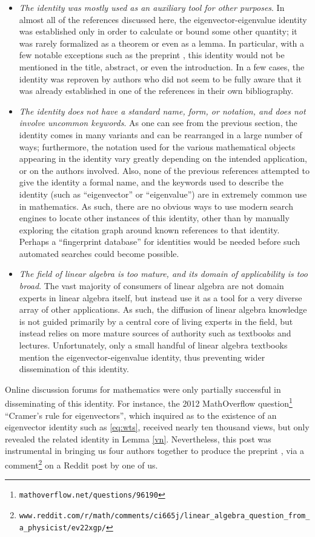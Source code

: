 \documentclass{amsart}
\begin{document}
\begin{itemize}
\item \emph{The identity was mostly used as an auxiliary tool for other purposes}.  In almost all of the references discussed here, the eigenvector-eigenvalue identity was established only in order to calculate or bound some other quantity; it was rarely formalized as a theorem or even as a lemma.  In particular, with a few notable exceptions such as the preprint \cite{2014arXiv1401.4580V}, this identity would not be mentioned in the title, abstract, or even the introduction.  In a few cases, the identity was reproven by authors who did not seem to be fully aware that it was already established in one of the references in their own bibliography.
\item \emph{The identity does not have a standard name, form, or notation, and does not involve uncommon keywords}.  As one can see from the previous section, the identity comes in many variants and can be rearranged in a large number of ways; furthermore, the notation used for the various mathematical objects appearing in the identity vary greatly depending on the intended application, or on the authors involved.  Also, none of the previous references attempted to give the identity a formal name, and the keywords used to describe the identity (such as ``eigenvector'' or ``eigenvalue'') are in extremely common use in mathematics.  As such, there are no obvious ways to use modern search engines to locate other instances of this identity, other than by manually exploring the citation graph around known references to that identity.  Perhaps a ``fingerprint database'' for identities \cite{BT} would be needed before such automated searches could become possible.
\item \emph{The field of linear algebra is too mature, and its domain of applicability is too broad}.  The vast majority of consumers of linear algebra are not domain experts in linear algebra itself, but instead use it as a tool for a very diverse array of other applications.  As such, the diffusion of linear algebra knowledge is not guided primarily by a central core of living experts in the field, but instead relies on more mature sources of authority such as textbooks and lectures.  Unfortunately, only a small handful of linear algebra textbooks mention the eigenvector-eigenvalue identity, thus preventing wider dissemination of this identity.
\end{itemize}

Online discussion forums for mathematics were only partially successful in disseminating of this identity.  For instance, the 2012 MathOverflow question\footnote{{\tt mathoverflow.net/questions/96190}} ``Cramer's rule for eigenvectors'', which inquired as to the existence of an eigenvector identity such as \eqref{eq:wts}, received nearly ten thousand views, but only revealed the related identity in Lemma \ref{vn}.  Nevertheless, this post was instrumental in bringing us four authors together to produce the preprint \cite{DPTZ}, via a comment\footnote{{\tt www.reddit.com/r/math/comments/ci665j/linear\_algebra\_question\_from\_a\_physicist/ev22xgp/}} on a Reddit post by one of us.
\end{document}

